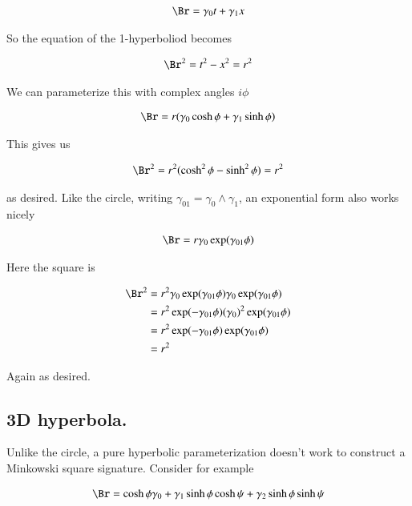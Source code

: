 \documentclass{article}
\begin{document}
\begin{align*}
\Br = \gamma_0 t + \gamma_1 x
\end{align*}

So the equation of the 1-hyperboliod becomes

\begin{align*}
\Br^2 = t^2 - x^2 = r^2
\end{align*}

We can parameterize this with complex angles $i\phi$

\begin{align*}
\Br = r (\gamma_0 \cosh\phi + \gamma_1 \sinh\phi) 
\end{align*}

This gives us

\begin{align*}
\Br^2 = r^2 (\cosh^2\phi - \sinh^2\phi) = r^2
\end{align*}

as desired.  Like the circle, writing $\gamma_{01} = \gamma_0 \wedge \gamma_1$, an exponential form also works nicely

\begin{align*}
\Br = r \gamma_0 \exp(\gamma_{01} \phi)
\end{align*}

Here the square is 

\begin{align*}
\Br^2 
&= r^2 \gamma_0 \exp(\gamma_{01} \phi) \gamma_0 \exp(\gamma_{01} \phi) \\
&= r^2 \exp(-\gamma_{01} \phi) (\gamma_0)^2 \exp(\gamma_{01} \phi) \\
&= r^2 \exp(-\gamma_{01} \phi) \exp(\gamma_{01} \phi) \\
&= r^2 \\
\end{align*}

Again as desired.

\subsection{ 3D hyperbola. }

Unlike the circle, a pure hyperbolic parameterization doesn't work to construct a Minkowski
square signature.  Consider for example

\begin{align*}
\Br 
&= \cosh \phi \gamma_0 + \gamma_1 \sinh\phi \cosh \psi + \gamma_2 \sinh\phi \sinh\psi \\
\end{align*}
\end{document}
